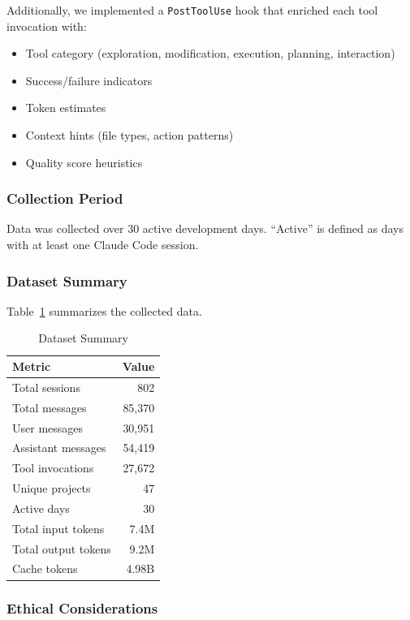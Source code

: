 \documentclass{ntlabs-preprint}
\begin{document}
Additionally, we implemented a \texttt{PostToolUse} hook that enriched each tool invocation with:
\begin{itemize}
    \item Tool category (exploration, modification, execution, planning, interaction)
    \item Success/failure indicators
    \item Token estimates
    \item Context hints (file types, action patterns)
    \item Quality score heuristics
\end{itemize}

\subsubsection{Collection Period}

Data was collected over 30 active development days. ``Active'' is defined as days with at least one Claude Code session.

\subsubsection{Dataset Summary}

Table~\ref{tab:dataset} summarizes the collected data.

\begin{table}[h]
\centering
\caption{Dataset Summary}
\label{tab:dataset}
\begin{tabular}{lr}
\toprule
\textbf{Metric} & \textbf{Value} \\
\midrule
Total sessions & 802 \\
Total messages & 85,370 \\
\quad User messages & 30,951 \\
\quad Assistant messages & 54,419 \\
Tool invocations & 27,672 \\
Unique projects & 47 \\
Active days & 30 \\
Total input tokens & 7.4M \\
Total output tokens & 9.2M \\
Cache tokens & 4.98B \\
\bottomrule
\end{tabular}
\end{table}

\subsubsection{Ethical Considerations}
\end{document}
